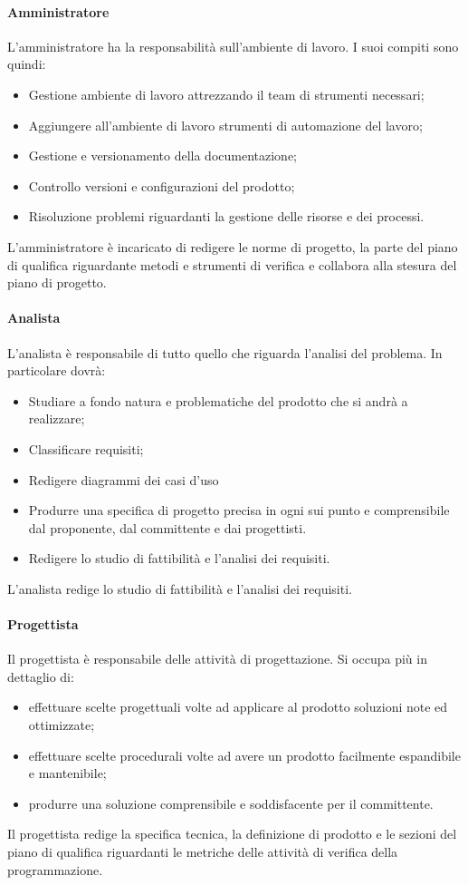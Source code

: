\paragraph{Amministratore}
L'amministratore ha la responsabilità sull'ambiente di lavoro.
I suoi compiti sono quindi:
\begin{itemize}
	\item Gestione ambiente di lavoro attrezzando il team di strumenti necessari;
	\item Aggiungere all'ambiente di lavoro strumenti di automazione del lavoro;
	\item Gestione e versionamento della documentazione;
	\item Controllo versioni e configurazioni del prodotto;
	\item Risoluzione problemi riguardanti la gestione delle risorse e dei processi.
\end{itemize}
L'amministratore è incaricato di redigere le norme di progetto, la parte del piano di qualifica riguardante metodi e strumenti di verifica e collabora alla stesura del piano di progetto.
\paragraph{Analista}
L'analista è responsabile di tutto quello che riguarda l'analisi del problema.
In particolare dovrà:
\begin{itemize}
	\item Studiare a fondo natura e problematiche del prodotto che si andrà a realizzare;
	\item Classificare requisiti;
	\item Redigere diagrammi dei casi d'uso
	\item Produrre una specifica di progetto precisa in ogni sui punto e comprensibile dal proponente, dal committente e dai progettisti.
	\item Redigere lo studio di fattibilità e l'analisi dei requisiti.
\end{itemize}
L'analista redige lo studio di fattibilità e l'analisi dei requisiti.
\paragraph{Progettista}
Il progettista è responsabile delle attività di progettazione. Si occupa più in dettaglio di:
\begin{itemize}
	\item effettuare scelte progettuali volte ad applicare al prodotto soluzioni note ed ottimizzate;
	\item effettuare scelte procedurali volte ad avere un prodotto facilmente espandibile e mantenibile;
	\item produrre una soluzione comprensibile e soddisfacente per il committente.
\end{itemize}
Il progettista redige la specifica tecnica, la definizione di prodotto e le sezioni del piano di qualifica riguardanti le metriche delle attività di verifica della programmazione.
